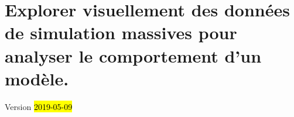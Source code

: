 \chapter{Explorer visuellement des données de simulation massives pour analyser le comportement d'un modèle.}
\label{chap:chap5}
\begin{center}
{\large Version \hl{2019-05-09}}

\end{center}
\minitoc

%

%

%

\setcounter{section}{2}


%

%

\printbibliography[title={Références}]

